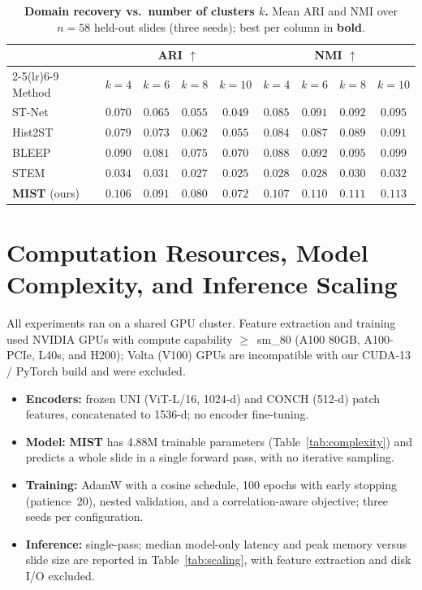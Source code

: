 \documentclass[11pt]{article}
\newcommand{\morph}{\textbf{MIST}}
\newcommand{\best}[1]{{\bfseries\boldmath #1}}
\begin{document}
\begin{table}[H]
\centering
\caption{\textbf{Domain recovery vs.\ number of clusters $k$.} Mean ARI and NMI over $n{=}58$ held-out
slides (three seeds); best per column in \best{bold}.}
\label{tab:krobust}
\small
\setlength{\tabcolsep}{5pt}
\begin{tabular}{l cccc cccc}
\toprule
 & \multicolumn{4}{c}{ARI $\uparrow$} & \multicolumn{4}{c}{NMI $\uparrow$} \\
\cmidrule(lr){2-5}\cmidrule(lr){6-9}
Method & $k{=}4$ & $k{=}6$ & $k{=}8$ & $k{=}10$ & $k{=}4$ & $k{=}6$ & $k{=}8$ & $k{=}10$ \\
\midrule
ST-Net  & $0.070$ & $0.065$ & $0.055$ & $0.049$ & $0.085$ & $0.091$ & $0.092$ & $0.095$ \\
Hist2ST & $0.079$ & $0.073$ & $0.062$ & $0.055$ & $0.084$ & $0.087$ & $0.089$ & $0.091$ \\
BLEEP   & $0.090$ & $0.081$ & $0.075$ & $0.070$ & $0.088$ & $0.092$ & $0.095$ & $0.099$ \\
STEM    & $0.034$ & $0.031$ & $0.027$ & $0.025$ & $0.028$ & $0.028$ & $0.030$ & $0.032$ \\
\midrule
\morph{} (ours) & \best{$0.106$} & \best{$0.091$} & \best{$0.080$} & \best{$0.072$} & \best{$0.107$} & \best{$0.110$} & \best{$0.111$} & \best{$0.113$} \\
\bottomrule
\end{tabular}
\end{table}

\section{Computation Resources, Model Complexity, and Inference Scaling}
\label{app:compute}
All experiments ran on a shared GPU cluster. Feature extraction and training used NVIDIA GPUs with
compute capability $\geq$~sm\_80 (A100 80GB, A100-PCIe, L40s, and H200); Volta (V100) GPUs are
incompatible with our CUDA-13 / PyTorch build and were excluded.
\begin{itemize}[nosep,leftmargin=1.4em]
\item \textbf{Encoders:} frozen UNI (ViT-L/16, 1024-d) and CONCH (512-d) patch features, concatenated
to 1536-d; no encoder fine-tuning.
\item \textbf{Model:} \morph{} has 4.88M trainable parameters (Table~\ref{tab:complexity}) and predicts
a whole slide in a single forward pass, with no iterative sampling.
\item \textbf{Training:} AdamW with a cosine schedule, 100 epochs with early stopping (patience~20),
nested validation, and a correlation-aware objective; three seeds per configuration.
\item \textbf{Inference:} single-pass; median model-only latency and peak memory versus slide size are
reported in Table~\ref{tab:scaling}, with feature extraction and disk I/O excluded.
\end{itemize}
\end{document}
